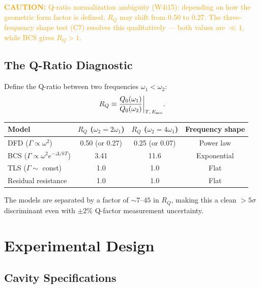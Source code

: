 \documentclass[11pt]{article}
\newcommand{\caution}[1]{\textcolor{orange}{\textbf{CAUTION:} #1}}
\begin{document}
\caution{Q-ratio normalization ambiguity (W4i15): depending on how
the geometric form factor is defined, $R_Q$ may shift from 0.50 to
0.27. The three-frequency shape test (C7) resolves this qualitatively
--- both values are $\ll 1$, while BCS gives $R_Q > 1$.}

\subsection{The Q-Ratio Diagnostic}

Define the Q-ratio between two frequencies $\omega_1 < \omega_2$:
\begin{equation}
R_Q \equiv \frac{Q_0(\omega_1)}{Q_0(\omega_2)}\bigg|_{T,\,E_{\rm acc}}.
\end{equation}

\begin{center}
\renewcommand{\arraystretch}{1.3}
\begin{tabular}{@{}lccc@{}}
\toprule
\textbf{Model} & \textbf{$R_Q$ ($\omega_2 = 2\omega_1$)} &
  \textbf{$R_Q$ ($\omega_2 = 4\omega_1$)} &
  \textbf{Frequency shape} \\
\midrule
DFD ($\Gamma \propto \omega^2$) & 0.50 (or 0.27) & 0.25 (or 0.07) &
  Power law \\
BCS ($\Gamma \propto \omega^2 e^{-\Delta/kT}$) & 3.41 & 11.6 &
  Exponential \\
TLS ($\Gamma \sim$ const) & 1.0 & 1.0 & Flat \\
Residual resistance & 1.0 & 1.0 & Flat \\
\bottomrule
\end{tabular}
\end{center}

The models are separated by a factor of $\sim 7$--$45$ in $R_Q$,
making this a clean $> 5\sigma$ discriminant even with $\pm 2\%$
Q-factor measurement uncertainty.


\section{Experimental Design}

\subsection{Cavity Specifications}
\end{document}
